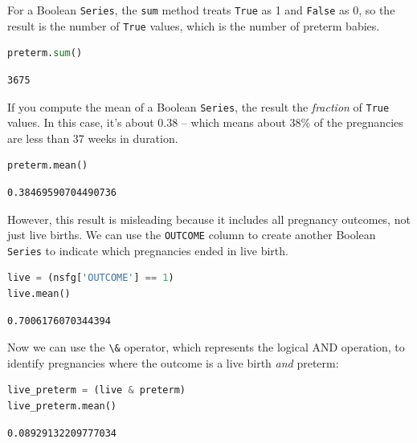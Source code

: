 For a Boolean \passthrough{\lstinline!Series!}, the
\passthrough{\lstinline!sum!} method treats
\passthrough{\lstinline!True!} as 1 and \passthrough{\lstinline!False!}
as 0, so the result is the number of \passthrough{\lstinline!True!}
values, which is the number of preterm babies.

\begin{lstlisting}[language=Python,style=source]
preterm.sum()
\end{lstlisting}

\begin{lstlisting}[style=output]
3675
\end{lstlisting}

If you compute the mean of a Boolean \passthrough{\lstinline!Series!},
the result the \emph{fraction} of \passthrough{\lstinline!True!} values.
In this case, it's about 0.38 -- which means about 38\% of the
pregnancies are less than 37 weeks in duration.

\begin{lstlisting}[language=Python,style=source]
preterm.mean()
\end{lstlisting}

\begin{lstlisting}[style=output]
0.38469590704490736
\end{lstlisting}

However, this result is misleading because it includes all pregnancy
outcomes, not just live births. We can use the
\passthrough{\lstinline!OUTCOME!} column to create another Boolean
\passthrough{\lstinline!Series!} to indicate which pregnancies ended in
live birth.

\begin{lstlisting}[language=Python,style=source]
live = (nsfg['OUTCOME'] == 1)
live.mean()
\end{lstlisting}

\begin{lstlisting}[style=output]
0.7006176070344394
\end{lstlisting}

Now we can use the \passthrough{\lstinline!\&!} operator, which
represents the logical AND operation, to identify pregnancies where the
outcome is a live birth \emph{and} preterm:

\begin{lstlisting}[language=Python,style=source]
live_preterm = (live & preterm)
live_preterm.mean()
\end{lstlisting}

\begin{lstlisting}[style=output]
0.08929132209777034
\end{lstlisting}

